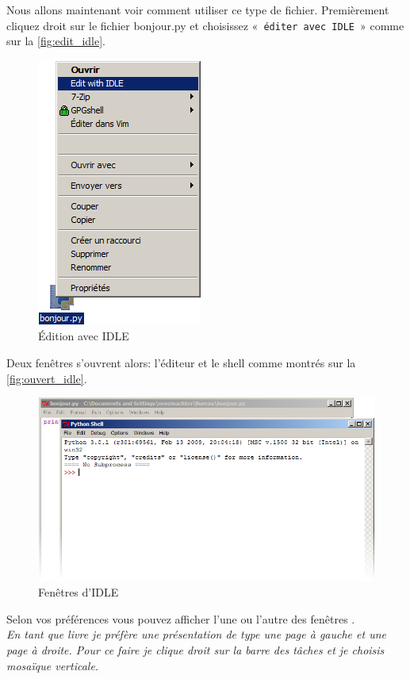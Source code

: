 Nous allons maintenant voir comment utiliser ce type de fichier.
Premièrement cliquez droit sur le fichier bonjour.py et choisissez «~\texttt{éditer avec IDLE}~» comme sur la \autoref{fig:edit_idle}.
\begin{figure}[h!]
\centering
\includegraphics[scale=0.5]{images/edit_idle.png} 
\caption{Édition avec IDLE}
\label{fig:edit_idle}
\end{figure}

Deux fenêtres s'ouvrent alors: l'éditeur et le shell comme montrés sur 
la \autoref{fig:ouvert_idle}.
\begin{figure}[h!]
\centering
\includegraphics[scale=0.5]{images/ouvert_idle.png} 
\caption{Fenêtres d'IDLE}
\label{fig:ouvert_idle}
\end{figure}

Selon vos préférences vous pouvez afficher l'une ou l'autre des fenêtres . \\

\emph{En tant que livre je préfère une présentation de type une page à gauche et
 une page à droite. Pour ce faire je clique droit sur la barre des tâches et je choisis mosaïque verticale.}\\

